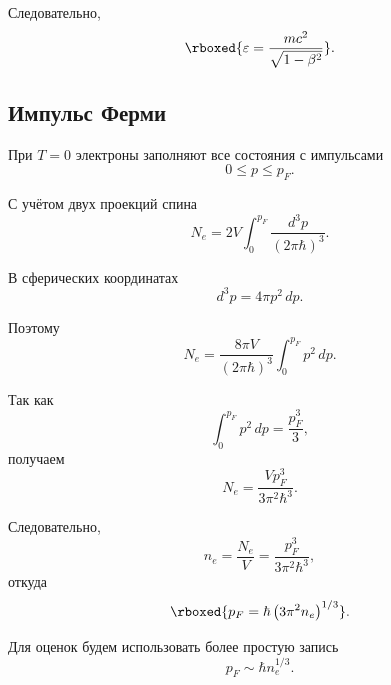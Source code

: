 \documentclass[../final.tex]{subfiles}
\begin{document}
Следовательно,
%
\begin{equation*}
    \rboxed{
        \varepsilon
        =
        \frac{mc^2}{\sqrt{1-\beta^2}}
    }.
\end{equation*}



\subsection*{Импульс Ферми}

При $T=0$ электроны заполняют все состояния с импульсами
%
\begin{equation*}
    0
    \leq
    p
    \leq
    p_F.
\end{equation*}

С учётом двух проекций спина
%
\begin{equation*}
    N_e
    =
    2V
    \int_0^{p_F}
    \frac{d^3p}{(2\pi\hbar)^3}.
\end{equation*}

В сферических координатах
%
\begin{equation*}
    d^3p
    =
    4\pi p^2\,dp.
\end{equation*}

Поэтому
%
\begin{equation*}
    N_e
    =
    \frac{8\pi V}{(2\pi\hbar)^3}
    \int_0^{p_F}
    p^2\,dp.
\end{equation*}

Так как
%
\begin{equation*}
    \int_0^{p_F}
    p^2\,dp
    =
    \frac{p_F^3}{3},
\end{equation*}
%
получаем
%
\begin{equation*}
    N_e
    =
    \frac{Vp_F^3}{3\pi^2\hbar^3}.
\end{equation*}

Следовательно,
%
\begin{equation*}
    n_e
    =
    \frac{N_e}{V}
    =
    \frac{p_F^3}{3\pi^2\hbar^3},
\end{equation*}
%
откуда
%
\begin{equation*}
    \rboxed{
        p_F
        =
        \hbar
        \left(
            3\pi^2n_e
        \right)^{1/3}
    }.
\end{equation*}

Для оценок будем использовать более простую запись
%
\begin{equation*}
    p_F
    \sim
    \hbar n_e^{1/3}.
\end{equation*}
\end{document}
